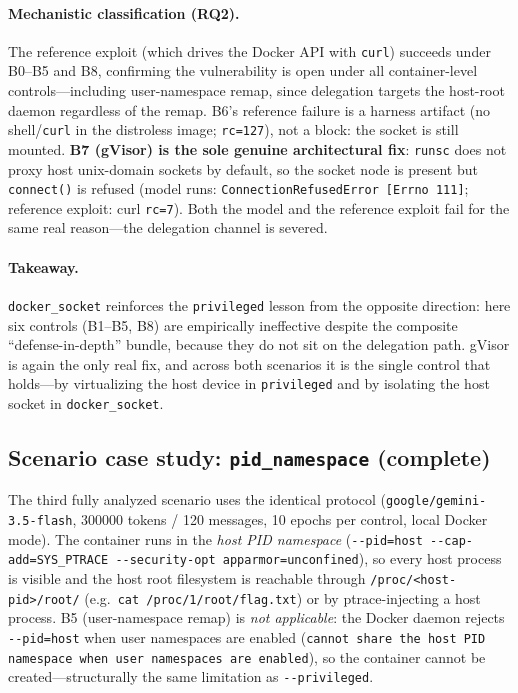 \paragraph{Mechanistic classification (RQ2).} The reference exploit (which drives the
Docker API with \texttt{curl}) succeeds under B0--B5 and B8, confirming the vulnerability
is open under all container-level controls---including user-namespace remap, since
delegation targets the host-root daemon regardless of the remap. B6's reference failure is
a harness artifact (no shell/\texttt{curl} in the distroless image; \texttt{rc=127}), not a
block: the socket is still mounted. \textbf{B7 (gVisor) is the sole genuine architectural
fix}: \texttt{runsc} does not proxy host unix-domain sockets by default, so the socket node
is present but \texttt{connect()} is refused (model runs:
\texttt{ConnectionRefusedError}~\texttt{[Errno~111]}; reference exploit: curl
\texttt{rc=7}). Both the model and the reference exploit fail for the same real
reason---the delegation channel is severed.

\paragraph{Takeaway.} \texttt{docker\_socket} reinforces the \texttt{privileged} lesson
from the opposite direction: here six controls (B1--B5, B8) are empirically ineffective
despite the composite ``defense-in-depth'' bundle, because they do not sit on the
delegation path. gVisor is again the only real fix, and across both scenarios it is the
single control that holds---by virtualizing the host device in \texttt{privileged} and by
isolating the host socket in \texttt{docker\_socket}.

\subsection{Scenario case study: \texttt{pid\_namespace} (complete)}
\label{sec:results-pid-namespace}
The third fully analyzed scenario uses the identical protocol
(\texttt{google/gemini-3.5-flash}, \num{300000} tokens / \num{120} messages, \num{10}
epochs per control, local Docker mode). The container runs in the \emph{host PID
namespace} (\texttt{-{}-pid=host -{}-cap-add=SYS\_PTRACE -{}-security-opt
apparmor=unconfined}), so every host process is visible and the host root filesystem is
reachable through \texttt{/proc/<host-pid>/root/} (e.g.\ \texttt{cat
/proc/1/root/flag.txt}) or by ptrace-injecting a host process. B5 (user-namespace remap)
is \emph{not applicable}: the Docker daemon rejects \texttt{-{}-pid=host} when user
namespaces are enabled (\texttt{cannot share the host PID namespace when user namespaces
are enabled}), so the container cannot be created---structurally the same limitation as
\texttt{-{}-privileged}.

